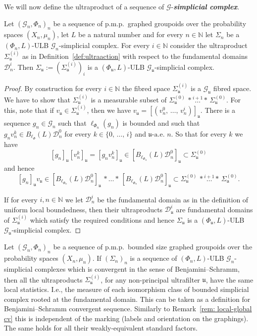 \documentclass[AHL,Unicode,longabstracts,published]{cedram}
\newcommand{\defin}[1]{\textbf{\emph{#1}}}
\newcommand{\Nmath}{\mathbb{N}}
\newcommand{\cg}{\mathcal{G}}
\newcommand{\cd}{\mathcal{D}}
\newcommand{\ul}{\mathfrak{u}}
\newcommand{\ulae}{\mathfrak{u}\textrm{-a.e. }n}
\newcommand{\pmp}{p.m.p.\ }
\begin{document}
We will now define the ultraproduct of a sequence of $\cg$-\defin{simplicial complex}.

\begin{prop}\label{prop:simpliciallimit}
Let $(\cg_n,\Phi_n)_n$ be a sequence of \pmp graphed groupoids over the probability spaces $(X_n,\mu_n)$, let $L$ be a natural number and for every $n\in\Nmath$ let $\Sigma_n$ be a $(\Phi_n,L)$-ULB $\cg_n$-simplicial complex. For every $i\in\Nmath$ consider the ultraproduct $\Sigma_\ul^{(i)}$ as in Definition~\ref{def:ultraaction} with respect to the fundamental domains $\cd_n^i$. Then $\Sigma_\ul:=(\Sigma_\ul^{(i)})_i$ is a $(\Phi_\ul,L)$-ULB $\cg_\ul$-simplicial complex.
\end{prop}
\begin{proof}
By construction for every $i\in\Nmath$ the fibred space $\Sigma_\ul^{(i)}$ is a $\cg_\ul$ fibred space. We have to show that $\Sigma_\ul^{(i)}$ is a measurable subset of $\Sigma_\ul^{(0)}\,*\stackrel{i+1}{\ldots}*\,\Sigma_\ul^{(0)}$. For this, note that if $v_\ul\in \Sigma_\ul^{(i)}$, then we have $v_\ul=[(v_n^0,\,\ldots,\,v_n^i)]_\ul$. There is a sequence $g_n \in \cg_n$ such that $\ell_{\Phi_n}(g_n)$ is bounded and such that $g_nv_n^k\in B_{\ell_\Phi}(L)\cd_n^0$ for every $k\in\{0,\,\ldots,\,i\}$ and $\ulae$. So that for every $k$ we have
\[
[g_n]_\ul[v_n^k]_\ul=[g_nv_n^k]_\ul\in \left[B_{\ell_{\Phi_n}}(L)\cd_n^0\right]_\ul\subset \Sigma_\ul^{(0)}
\]
and hence
\[
[g_n]_\ul v_\ul\in \left[B_{\ell_{\Phi_n}}(L)\cd_n^0\right]_\ul\,*\ldots*\,\left[B_{\ell_{\Phi_n}}(L)\cd_n^0\right]_\ul\subset \Sigma_\ul^{(0)}\,*\stackrel{i+1}{\ldots}*\,\Sigma_\ul^{(0)}.
\]

If for every $i,n\in\Nmath$ we let $\cd_n^i$ be the fundamental domain as in the definition of uniform local boundedness, then their ultraproducts $\cd_\ul^i$ are fundamental domains of $\Sigma_\ul^{(i)}$ which satisfy the required conditions and hence $\Sigma_\ul$ is a $(\Phi_\ul,L)$-ULB $\cg_\ul$-simplicial complex.
\end{proof}


\begin{rema}\label{rem: BS-CV of complexes}
Let $(\cg_n,\Phi_n)_n$ be a sequence of \pmp bounded size graphed groupoids over the probability spaces $(X_n,\mu_n)$. If $(\Sigma_n)_n$ is a sequence of $(\Phi_n,L)$-ULB $\cg_n$-simplicial complexes which is convergent in the sense of Benjamini--Schramm, then all the ultraproducts $\Sigma_\ul^{(i)}$, for any non-principal ultrafilter $\ul$, have the same local statistics. I.e., the measure of each isomorphism class of bounded simplicial complex rooted at the fundamental domain. This can be taken as a definition for Benjamini--Schramm convergent sequence. Similarly to Remark~\ref{rem: local-global cv} this is independent of the marking (labels and orientation on the graphings). The same holds for all their weakly-equivalent standard factors.
\end{rema}
\end{document}
